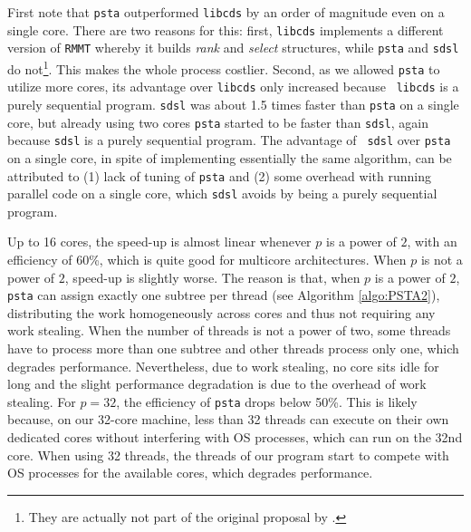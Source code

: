 First note that {\tt psta} outperformed {\tt libcds} by an order of
magnitude even on a single core. There are two reasons for this:
first, \verb+libcds+ implements a different version of \verb+RMMT+
whereby it builds {\em rank} and {\em select} structures, while
\verb+psta+ and \verb+sdsl+ do not\footnote{They are actually not part
  of the original proposal by
  \cite{Navarro:2014:FFS:2620785.2601073}.}. This makes the whole
process costlier. Second, as we allowed {\tt psta} to utilize more
cores, its advantage over {\tt libcds} only increased because {\tt
  libcds} is a purely sequential program.  {\tt sdsl} was about 1.5
times faster than {\tt psta} on a single core, but already using two
cores {\tt psta} started to be faster than {\tt sdsl}, again because
{\tt sdsl} is a purely sequential program.  The advantage of {\tt
  sdsl} over {\tt psta} on a single core, in spite of implementing
essentially the same algorithm, can be attributed to (1) lack of
tuning of {\tt psta} and (2) some overhead with running parallel code
on a single core, which {\tt sdsl} avoids by being a purely sequential
program.

Up to 16 cores, the speed-up is almost linear whenever $p$ is a power
of $2$, with an efficiency of 60\%, which is quite good for multicore
architectures.  When $p$ is not a power of $2$, speed-up is slightly
worse.  The reason is that, when $p$ is a power of $2$, {\tt psta} can
assign exactly one subtree per thread (see Algorithm
\ref{algo:PSTA2}), distributing the work homogeneously across cores
and thus not requiring any work stealing.  When the number of threads
is not a power of two, some threads have to process more than one
subtree and other threads process only one, which degrades
performance.  Nevertheless, due to work stealing, no core sits idle
for long and the slight performance degradation is due to the overhead
of work stealing.  For $p = 32$, the efficiency of {\tt psta} drops
below 50\%.  This is likely because, on our 32-core machine, less than
32 threads can execute on their own dedicated cores without
interfering with OS processes, which can run on the 32nd core.  When
using 32 threads, the threads of our program start to compete with OS
processes for the available cores, which degrades performance.

